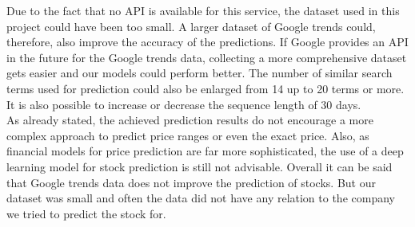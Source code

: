 Due to the fact that no API is available for this service, the dataset used in this project could have been too small. A larger dataset of Google trends could, therefore, also improve the accuracy of the predictions. If Google provides an API in the future for the Google trends data, collecting a more comprehensive dataset gets easier and our models could perform better. The number of similar search terms used for prediction could also be enlarged from 14 up to 20 terms or more. It is also possible to increase or decrease the sequence length of 30 days.
\\
As already stated, the achieved prediction results do not encourage a more complex approach to predict price ranges or even the exact price. Also, as financial models for price prediction are far more sophisticated, the use of a deep learning model for stock prediction is still not advisable. Overall it can be said that Google trends data does not improve the prediction of stocks. But our dataset was small and often the data did not have any relation to the company we tried to predict the stock for.

